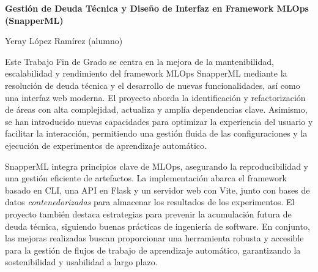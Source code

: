 

\cleardoublepage
\thispagestyle{empty}

\begin{center}
       {\large\bfseries Gestión de Deuda Técnica y Diseño de Interfaz en Framework MLOps (SnapperML)}\\
\end{center}
\begin{center}
       Yeray López Ramírez (alumno)\\
\end{center}


\vspace{1.0cm}


\vspace{0.5cm}

Este Trabajo Fin de Grado se centra en la mejora de la mantenibilidad, escalabilidad y rendimiento del framework MLOps SnapperML mediante la resolución de deuda técnica y el desarrollo de nuevas funcionalidades, así como una interfaz web moderna. El proyecto aborda la identificación y refactorización de áreas con alta complejidad, actualiza y amplía dependencias clave. Asimismo, se han introducido nuevas capacidades para optimizar la experiencia del usuario y facilitar la interacción, permitiendo una gestión fluida de las configuraciones y la ejecución de experimentos de aprendizaje automático.

\vspace{2.5mm}

SnapperML integra principios clave de MLOps, asegurando la reproducibilidad y una gestión eficiente de artefactos. La implementación abarca el framework basado en CLI, una API en Flask y un servidor web con Vite, junto con bases de datos \textit{contenedorizadas} para almacenar los resultados de los experimentos. El proyecto también destaca estrategias para prevenir la acumulación futura de deuda técnica, siguiendo buenas prácticas de ingeniería de software. En conjunto, las mejoras realizadas buscan proporcionar una herramienta robusta y accesible para la gestión de flujos de trabajo de aprendizaje automático, garantizando la sostenibilidad y usabilidad a largo plazo.
\cleardoublepage


